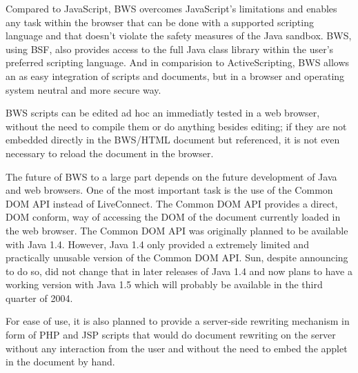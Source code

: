 Compared to JavaScript, BWS overcomes JavaScript's limitations and enables any task within the browser that can be done with a supported scripting language and that doesn't violate the safety measures of the Java sandbox. BWS, using BSF, also provides access to the full Java class library within the user's preferred scripting language. And in comparision to ActiveScripting, BWS allows an as easy integration of scripts and documents, but in a browser and operating system neutral and more secure way.

BWS scripts can be edited ad hoc an immediatly tested in a web browser, without the need to compile them or do anything besides editing; if they are not embedded directly in the BWS/HTML document but referenced, it is not even necessary to reload the document in the browser.

The future of BWS to a large part depends on the future development of Java and web browsers. One of the most important task is the use of the Common DOM API instead of LiveConnect. The Common DOM API provides a direct, DOM conform, way of accessing the DOM of the document currently loaded in the web browser. The Common DOM API was originally planned to be available with Java 1.4. However, Java 1.4 only provided a extremely limited and practically unusable version of the Common DOM API. Sun, despite announcing to do so, did not change that in later releases of Java 1.4 and now plans to have a working version with Java 1.5 which will probably be available in the third quarter of 2004.

For ease of use, it is also planned to provide a server-side rewriting mechanism in form of PHP and JSP scripts that would do document rewriting on the server without any interaction from the user and without the need to embed the applet in the document by hand.